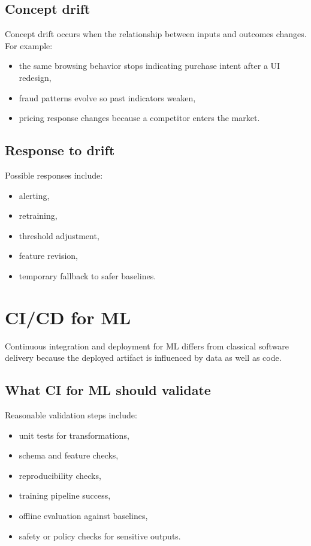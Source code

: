 \subsection{Concept drift}
Concept drift occurs when the relationship between inputs and outcomes changes.
For example:
\begin{itemize}
  \item the same browsing behavior stops indicating purchase intent after a UI redesign,
  \item fraud patterns evolve so past indicators weaken,
  \item pricing response changes because a competitor enters the market.
\end{itemize}

\subsection{Response to drift}
Possible responses include:
\begin{itemize}
  \item alerting,
  \item retraining,
  \item threshold adjustment,
  \item feature revision,
  \item temporary fallback to safer baselines.
\end{itemize}

\section{CI/CD for ML}
Continuous integration and deployment for ML differs from classical software delivery because the deployed artifact is influenced by data as well as code.

\subsection{What CI for ML should validate}
Reasonable validation steps include:
\begin{itemize}
  \item unit tests for transformations,
  \item schema and feature checks,
  \item reproducibility checks,
  \item training pipeline success,
  \item offline evaluation against baselines,
  \item safety or policy checks for sensitive outputs.
\end{itemize}

